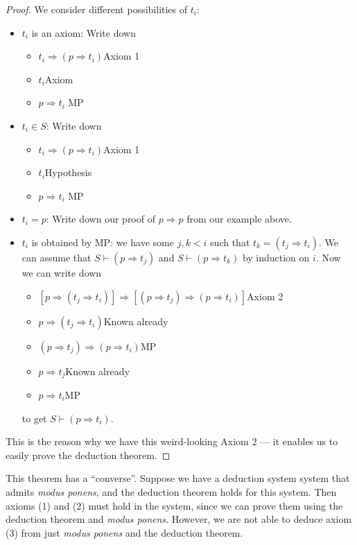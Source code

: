 \documentclass[a4paper]{article}
\begin{document}
\begin{proof}
  We consider different possibilities of $t_i$:
  \begin{itemize}
    \item $t_i$ is an axiom: Write down
      \begin{itemize}
        \item $t_i\Rightarrow (p\Rightarrow t_i)$\hfill Axiom 1
        \item $t_i$\hfill Axiom
        \item $p\Rightarrow t_i$ \hfill MP
      \end{itemize}
    \item $t_i\in S$: Write down
      \begin{itemize}
        \item $t_i\Rightarrow (p\Rightarrow t_i)$\hfill Axiom 1
        \item $t_i$\hfill Hypothesis
        \item $p\Rightarrow t_i$ \hfill MP
      \end{itemize}
    \item $t_i = p$: Write down our proof of $p\Rightarrow p$ from our example above.
    \item $t_i$ is obtained by MP: we have some $j, k< i$ such that $t_k = (t_j\Rightarrow t_i)$. We can assume that $S\vdash (p\Rightarrow t_j)$ and $S\vdash (p\Rightarrow t_k)$ by induction on $i$. Now we can write down
      \begin{itemize}
        \item $[p\Rightarrow (t_j\Rightarrow t_i)]\Rightarrow [(p\Rightarrow t_j)\Rightarrow (p\Rightarrow t_i)]$\hfill Axiom 2
        \item $p\Rightarrow (t_j\Rightarrow t_i)$\hfill Known already
        \item $(p\Rightarrow t_j)\Rightarrow (p\Rightarrow t_i)$\hfill MP
        \item $p\Rightarrow t_j$\hfill Known already
        \item $p\Rightarrow t_i$\hfill MP
      \end{itemize}
      to get $S\vdash (p\Rightarrow t_i)$.
  \end{itemize}
  This is the reason why we have this weird-looking Axiom 2 --- it enables us to easily prove the deduction theorem.
\end{proof}

This theorem has a ``converse''. Suppose we have a deduction system system that admits \emph{modus ponens}, and the deduction theorem holds for this system. Then axioms (1) and (2) must hold in the system, since we can prove them using the deduction theorem and \emph{modus ponens}. However, we are not able to deduce axiom (3) from just \emph{modus ponens} and the deduction theorem.
\end{document}
